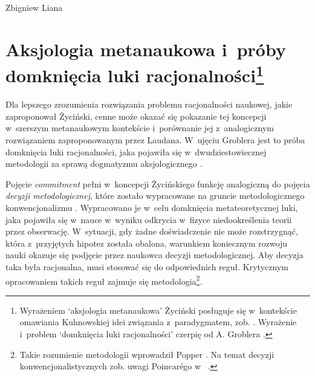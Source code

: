 \begin{artplenv}{Zbigniew Liana}
\section[Aksjologia metanaukowa i~próby domknięcia luki racjonalności]{Aksjologia metanaukowa i~próby domknięcia luki racjonalności\footnote{Wyrażeniem ‘aksjologia metanaukowa' Życiński posługuje się w~kontekście omawiania Kuhnowskiej idei związania z~paradygmatem, zob.
\parencite[][s.~161]{zycinski_teizm_1985}. %
 Wyrażenie i~problem ‘domknięcia luki racjonalności' czerpię od A. Groblera 
\parencite*[][s.~11–22]{grobler_prawda_1993}.%
}}
Dla lepszego zrozumienia rozwiązania problemu racjonalności naukowej, jakie zaproponował Życiński, cenne może okazać się pokazanie tej koncepcji w~szerszym metanaukowym kontekście i~porównanie jej z~analogicznym rozwiązaniem zaproponowanym przez Laudana. W~ujęciu Groblera jest to próba domknięcia luki racjonalności, jaka pojawiła się w~dwudziestowiecznej metodologii za sprawą dogmatyzmu aksjologicznego
\parencite[][s.~12nn]{grobler_prawda_1993}.%


Pojęcie \textit{commitment} pełni w~koncepcji Życińskiego funkcję analogiczną do pojęcia \textit{decyzji} \textit{metodologicznej}, które zostało wypracowane na gruncie metodologicznego konwencjonalizmu
\parencite[por.][s.~157.159n]{zycinski_teizm_1985}. %
 Wypracowano je w~celu domknięcia metateoretycznej luki, jaka pojawiła się w~nauce w~wyniku odkrycia w~fizyce niedookreślenia teorii przez obserwację. W~sytuacji, gdy żadne doświadczenie nie może rozstrzygnąć, która z~przyjętych hipotez została obalona, warunkiem koniecznym rozwoju nauki okazuje się podjęcie przez naukowca decyzji metodologicznej. Aby decyzja taka była racjonalna, musi stosować się do odpowiednich reguł. Krytycznym opracowaniem takich reguł zajmuje się metodologia\footnote{Takie rozumienie metodologii wprowadził Popper 
\parencite[zob. np.][s.~5.111]{popper_beiden_1979}. %
 Na temat decyzji konwencjonalistycznych zob. uwagi Poincarégo w~
\parencite[][s.~261–269]{szumilewicz-lachman_poincare_1978}.%
}.


\end{artplenv}
